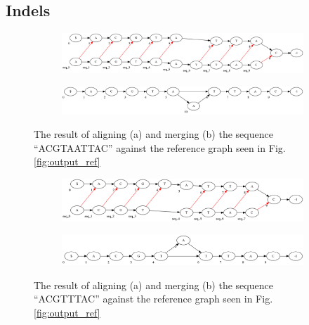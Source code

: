 \documentclass[thesis.tex]{subfiles}
\begin{document}
\subsection{Indels}
\begin{figure}[H]
  \begin{subfigure}[t]{\textwidth}
    \begin{mdframed}
      \includegraphics[width=\textwidth]{outputs/insertion-alignment.png}
    \end{mdframed}
    \subcaption{}
  \end{subfigure}
  \begin{subfigure}[t]{\textwidth}
    \begin{mdframed}
      \includegraphics[width=\textwidth]{outputs/insertion-merge.png}
    \end{mdframed}
    \subcaption{}
  \end{subfigure}
  \caption{The result of aligning (a) and merging (b) the sequence ``ACGTAATTAC'' against the reference graph seen in Fig. \ref{fig:output_ref}}
  \label{fig:output_insertion}
\end{figure}
\begin{figure}[H]
  \begin{subfigure}[t]{\textwidth}
    \begin{mdframed}
      \includegraphics[width=\textwidth]{outputs/deletion-alignment.png}
    \end{mdframed}
    \subcaption{}
  \end{subfigure}
  \begin{subfigure}[t]{\textwidth}
    \begin{mdframed}
      \includegraphics[width=\textwidth]{outputs/deletion-merge.png}
    \end{mdframed}
    \subcaption{}
  \end{subfigure}
  \caption{The result of aligning (a) and merging (b) the sequence ``ACGTTTAC'' against the reference graph seen in Fig. \ref{fig:output_ref}}
  \label{fig:output_deletion}
\end{figure}
\end{document}
